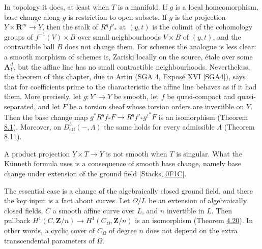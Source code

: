 \documentclass[11pt]{article}
\begin{document}
In topology it does, at least when \(T\) is a manifold. If \(g\) is a local homeomorphism, base change along \(g\) is restriction to open subsets. If \(g\) is the projection \(Y\times\mathbf R^m\to Y\), then the stalk of \(R^qf'_*\) at \((y,t)\) is the colimit of the cohomology groups of \(f^{-1}(V)\times B\) over small neighbourhoods \(V\times B\) of \((y,t)\), and the contractible ball \(B\) does not change them. For schemes the analogue is less clear: a smooth morphism of schemes is, Zariski locally on the source, étale over some \(\mathbf A^d_Y\), but the affine line has no small contractible neighbourhoods. Nevertheless, the theorem of this chapter, due to Artin (SGA 4, Exposé XVI [\hyperref[bp702]{SGA4}]), says that for coefficients prime to the characteristic the affine line behaves as if it had them. More precisely, let \(g:Y'\to Y\) be smooth, let \(f\) be quasi-compact and quasi-separated, and let \(F\) be a torsion sheaf whose torsion orders are invertible on \(Y\). Then the base change map \(g^*R^qf_*F\to R^qf'_*g'^*F\) is an isomorphism (Theorem \hyperref[bp643]{8.1}). Moreover, on \(D^b_{\mathrm{ctf}}(-,\Lambda)\) the same holds for every admissible \(\Lambda\) (Theorem \hyperref[bp681]{8.11}).

A product projection \(Y\times T\to Y\) is not smooth when \(T\) is singular. What the Künneth formula uses is a consequence of smooth base change, namely base change under extension of the ground field [Stacks, \href{https://stacks.math.columbia.edu/tag/0F1C}{0F1C}].

The essential case is a change of the algebraically closed ground field, and there the key input is a fact about curves. Let \(\Omega/L\) be an extension of algebraically closed fields, \(C\) a smooth affine curve over \(L\), and \(n\) invertible in \(L\). Then pullback \(H^1(C,\mathbf Z/n)\to H^1(C_\Omega,\mathbf Z/n)\) is an isomorphism (Theorem \hyperref[bp340]{4.20}). In other words, a cyclic cover of \(C_\Omega\) of degree \(n\) does not depend on the extra transcendental parameters of \(\Omega\).
\end{document}
